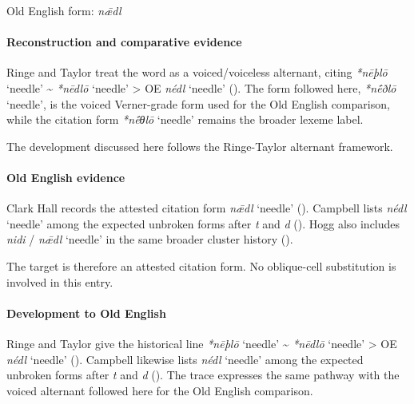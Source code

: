 \documentclass[
  british,
  a4paper,
]{article}
\providecommand{\Recon}[1]{\emph{*#1}}
\begin{document}
Old English form: \emph{nǣdl}

\paragraph{Reconstruction and comparative
evidence}\label{reconstruction-and-comparative-evidence-99}

Ringe and Taylor treat the word as a voiced/voiceless alternant, citing
\Recon{nēþlō} `needle' \textasciitilde{} \Recon{nēdlō} `needle'
\textgreater{} OE \emph{nédl} `needle'
(). The form
followed here, \Recon{nḗðlō} `needle', is the voiced Verner-grade form
used for the Old English comparison, while the citation form
\Recon{nḗθlō} `needle' remains the broader lexeme label.

The development discussed here follows the Ringe-Taylor alternant
framework.

\paragraph{Old English evidence}\label{old-english-evidence-99}

Clark Hall records the attested citation form \emph{nǣdl} `needle'
(). Campbell lists
\emph{nédl} `needle' among the expected unbroken forms after \emph{t}
and \emph{d} ().
Hogg also includes \emph{nidi} / \emph{nǣdl} `needle' in the same
broader cluster history ().

The target is therefore an attested citation form. No oblique-cell
substitution is involved in this entry.

\paragraph{Development to Old
English}\label{development-to-old-english-99}

Ringe and Taylor give the historical line \Recon{nēþlō} `needle'
\textasciitilde{} \Recon{nēdlō} `needle' \textgreater{} OE \emph{nédl}
`needle' ().
Campbell likewise lists \emph{nédl} `needle' among the expected unbroken
forms after \emph{t} and \emph{d} (). The trace expresses the same pathway with the voiced
alternant followed here for the Old English comparison.
\end{document}

